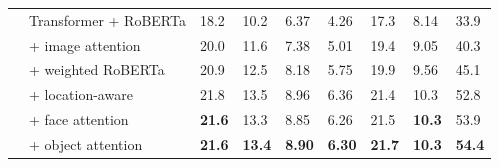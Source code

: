 \documentclass[10pt,twocolumn,letterpaper]{article}
\begin{document}
\begin{table}[p]
\begin{tabularx}{\textwidth}{llXXXXXXX}
       & Transformer + RoBERTa                        & 18.2   & 10.2   & 6.37   & 4.26   & 17.3  & 8.14   & 33.9  \\
       & \quad + image attention           & 20.0   & 11.6   & 7.38   & 5.01   & 19.4  & 9.05   & 40.3  \\
       & \quad\quad + weighted RoBERTa                 & 20.9   & 12.5   & 8.18   & 5.75   & 19.9  & 9.56   & 45.1  \\
       & \quad\quad\quad + location-aware              & 21.8   & 13.5   & 8.96   & 6.36   & 21.4  & 10.3   & 52.8  \\
       & \quad\quad\quad\quad + face attention         & \textbf{21.6}   & 13.3   & 8.85   & 6.26   & 21.5  & \textbf{10.3}   & 53.9  \\
       & \quad\quad\quad\quad\quad + object attention  & \textbf{21.6}   & \textbf{13.4}   & \textbf{8.90}   & \textbf{6.30}   & \textbf{21.7}  & \textbf{10.3}   & \textbf{54.4}  \\
      \bottomrule
   \end{tabularx}
\end{table}
\end{document}
